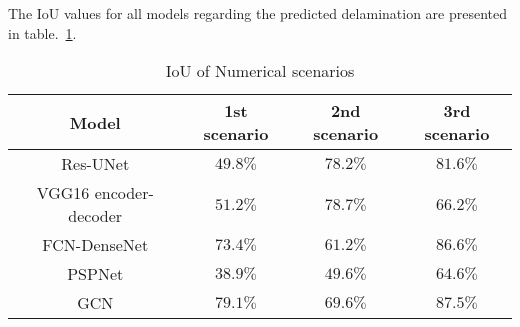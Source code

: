The IoU values for all models regarding the predicted delamination are presented in table.~\ref{tab:table_numerical_scenarios}.
\begin{table}[]
	\centering
	\caption{IoU of Numerical scenarios}
	\label{tab:table_numerical_scenarios}
	\resizebox{\textwidth}{!}
	{
		\begin{tabular}{cccc}\hline
			Model & 1st scenario & 2nd scenario & 3rd scenario \\ \hline
			Res-UNet & \(49.8\%\) & \(78.2\%\) & \(81.6\%\)  \\ 
			VGG16 encoder-decoder & \(51.2\%\) & \(78.7\%\)  & \(66.2\%\)  \\
			FCN-DenseNet & \(73.4\%\)  & \(61.2\%\)  & \(86.6\%\)  \\ 
			PSPNet & \(38.9\%\) & \(49.6\%\) & \(64.6\%\)  \\ 
			GCN & \(79.1\%\) & \(69.6\%\) & \(87.5\%\) \\ \hline
		\end{tabular}
	}
\end{table}

